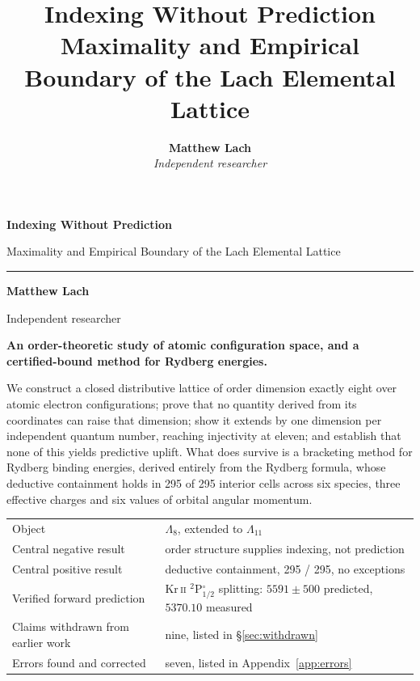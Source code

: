 \documentclass[11pt,a4paper]{article}
\title{\vspace{-12mm}\textbf{\Huge Indexing Without Prediction}\\[3mm]
       {\large\color{acctwo} Maximality and Empirical Boundary of the
        Lach Elemental Lattice}}
\author{\textbf{Matthew Lach}\\[1mm]{\small\itshape Independent researcher}}
\date{}
\theoremstyle{definition}
\newcommand{\Lm}{\ensuremath{\Lambda}}
\begin{document}
\begin{titlepage}
\thispagestyle{empty}
\vspace*{28mm}
{\noindent\Huge\bfseries Indexing Without Prediction\par}
\vspace{3mm}
{\noindent\large\color{acctwo} Maximality and Empirical Boundary of the Lach
 Elemental Lattice\par}
\vspace{4mm}
\noindent\textcolor{acc}{\rule{\linewidth}{1pt}}
\vspace{10mm}

{\noindent\large\textbf{Matthew Lach}\par}
{\noindent\small\color{mut} Independent researcher\par}
\vspace{10mm}

\noindent\textbf{An order-theoretic study of atomic configuration space, and a
certified-bound method for Rydberg energies.}
\vspace{3mm}

{\noindent\small\color{mut}
We construct a closed distributive lattice of order dimension exactly eight over
atomic electron configurations; prove that no quantity derived from its
coordinates can raise that dimension; show it extends by one dimension per
independent quantum number, reaching injectivity at eleven; and establish that
none of this yields predictive uplift. What does survive is a bracketing method
for Rydberg binding energies, derived entirely from the Rydberg formula, whose
deductive containment holds in 295 of 295 interior cells across six species,
three effective charges and six values of orbital angular momentum.\par}
\vspace{12mm}

\noindent\begin{tabular}{@{}p{58mm}p{95mm}@{}}
\toprule
Object & \Lm$_{8}$, extended to \Lm$_{11}$\\
Central negative result & order structure supplies indexing, not prediction\\
Central positive result & deductive containment, 295 / 295, no exceptions\\
Verified forward prediction & Kr\,\textsc{ii} $^2$P$^{\circ}_{1/2}$ splitting:
  $5591\pm500$ predicted, $5370.10$ measured\\
Claims withdrawn from earlier work & nine, listed in \S\ref{sec:withdrawn}\\
Errors found and corrected & seven, listed in Appendix~\ref{app:errors}\\
\bottomrule
\end{tabular}
\vspace{14mm}


\end{titlepage}
\end{document}
